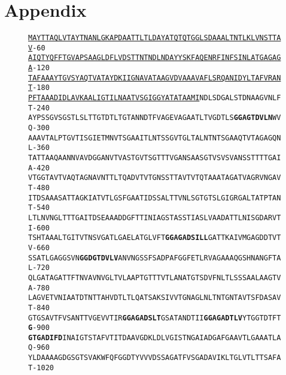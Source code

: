 \chapter*{Appendix}
\begin{figure}[htb]
  	\begin{center}
\label{app:rsaseq}
\texttt{\singlespacing\small\underline{MAYTTAQLVTAYTNANLGKAPDAATTLTLDAYATQTQTGGLSDAAALTNTLKLVNSTTAV}\hfill-60~~\\
\underline{AIQTYQFFTGVAPSAAGLDFLVDSTTNTNDLNDAYYSKFAQENRFINFSINLATGAGAGA}\hfill-120~\\
\underline{TAFAAAYTGVSYAQTVATAYDKIIGNAVATAAGVDVAAAVAFLSRQANIDYLTAFVRANT}\hfill-180~\\
\underline{PFTAAADIDLAVKAALIGTILNAATVSGIGGYATATAAMI}NDLSDGALSTDNAAGVNLFT\hfill-240~\\
AYPSSGVSGSTLSLTTGTDTLTGTANNDTFVAGEVAGAATLTVGDTLS\textbf{GGAGTDVLN}WVQ\hfill-300~\\
AAAVTALPTGVTISGIETMNVTSGAAITLNTSSGVTGLTALNTNTSGAAQTVTAGAGQNL\hfill-360~\\
TATTAAQAANNVAVDGGANVTVASTGVTSGTTTVGANSAASGTVSVSVANSSTTTTGAIA\hfill-420~\\
VTGGTAVTVAQTAGNAVNTTLTQADVTVTGNSSTTAVTVTQTAAATAGATVAGRVNGAVT\hfill-480~\\
ITDSAAASATTAGKIATVTLGSFGAATIDSSALTTVNLSGTGTSLGIGRGALTATPTANT\hfill-540~\\
LTLNVNGLTTTGAITDSEAAADDGFTTINIAGSTASSTIASLVAADATTLNISGDARVTI\hfill-600~\\
TSHTAAALTGITVTNSVGATLGAELATGLVFT\textbf{GGAGADSILL}GATTKAIVMGAGDDTVTV\hfill-660~\\
SSATLGAGGSVN\textbf{GGDGTDVLV}ANVNGSSFSADPAFGGFETLRVAGAAAQGSHNANGFTAL\hfill-720~\\
QLGATAGATTFTNVAVNVGLTVLAAPTGTTTVTLANATGTSDVFNLTLSSSAALAAGTVA\hfill-780~\\
LAGVETVNIAATDTNTTAHVDTLTLQATSAKSIVVTGNAGLNLTNTGNTAVTSFDASAVT\hfill-840~\\
GTGSAVTFVSANTTVGEVVTIR\textbf{GGAGADSLT}GSATANDTII\textbf{GGAGADTLV}YTGGTDTFT\textbf{G}\hfill-900~\\
\textbf{GTGADIFD}INAIGTSTAFVTITDAAVGDKLDLVGISTNGAIADGAFGAAVTLGAAATLAQ\hfill-960~\\
YLDAAAAGDGSGTSVAKWFQFGGDTYVVVDSSAGATFVSGADAVIKLTGLVTLTTSAFAT\hfill-1020\\
}
\end{center}
\end{figure}
